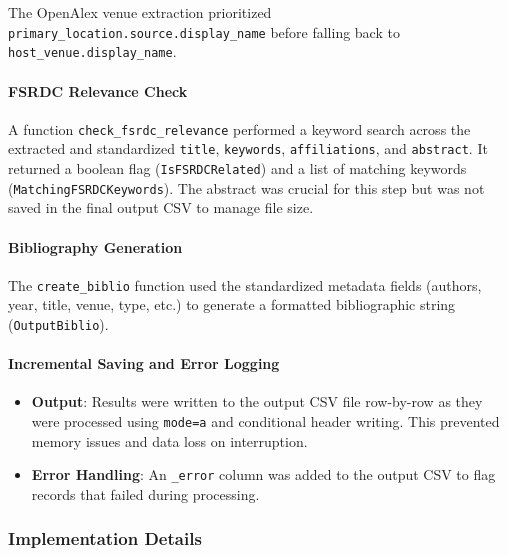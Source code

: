\documentclass[12pt]{article}
\providecommand{\tightlist}{%
  \setlength{\itemsep}{0pt}\setlength{\parskip}{0pt}}
\begin{document}
The OpenAlex venue extraction prioritized
\texttt{primary\_location.source.display\_name} before falling back to
\texttt{host\_venue.display\_name}.

\paragraph{FSRDC Relevance Check}\label{fsrdc-relevance-check}

A function \texttt{check\_fsrdc\_relevance} performed a keyword search
across the extracted and standardized \texttt{title}, \texttt{keywords},
\texttt{affiliations}, and \texttt{abstract}. It returned a boolean flag
(\texttt{IsFSRDCRelated}) and a list of matching keywords
(\texttt{MatchingFSRDCKeywords}). The abstract was crucial for this step
but was not saved in the final output CSV to manage file size.

\paragraph{Bibliography
Generation}\label{bibliography-generation}

The \texttt{create\_biblio} function used the standardized metadata
fields (authors, year, title, venue, type, etc.) to generate a formatted
bibliographic string (\texttt{OutputBiblio}).

\paragraph{Incremental Saving and Error
Logging}\label{incremental-saving-and-error-logging}

\begin{itemize}
\tightlist
\item
  \textbf{Output}: Results were written to the output CSV file
  row-by-row as they were processed using
  \texttt{mode=\textquotesingle{}a\textquotesingle{}} and conditional
  header writing. This prevented memory issues and data loss on
  interruption.
\item
  \textbf{Error Handling}: An \texttt{\_error} column was added to the
  output CSV to flag records that failed during processing.
\end{itemize}

\subsubsection{Implementation Details}\label{implementation-details-2}
\end{document}
